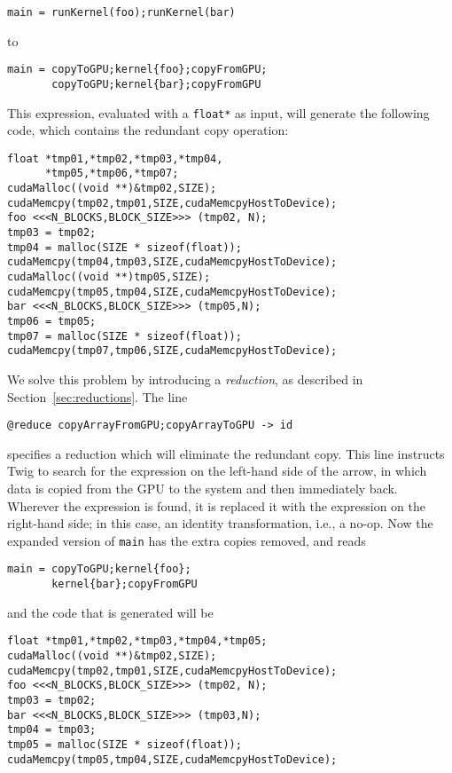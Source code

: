 \begin{verbatim}
main = runKernel(foo);runKernel(bar)
\end{verbatim}

to 

\begin{verbatim}
main = copyToGPU;kernel{foo};copyFromGPU;
       copyToGPU;kernel{bar};copyFromGPU
\end{verbatim}

This expression, evaluated with a \texttt{float*} as input, will generate the
following code, which contains the redundant copy operation:

\begin{verbatim}
float *tmp01,*tmp02,*tmp03,*tmp04,
      *tmp05,*tmp06,*tmp07;
cudaMalloc((void **)&tmp02,SIZE);
cudaMemcpy(tmp02,tmp01,SIZE,cudaMemcpyHostToDevice);
foo <<<N_BLOCKS,BLOCK_SIZE>>> (tmp02, N);
tmp03 = tmp02;
tmp04 = malloc(SIZE * sizeof(float));
cudaMemcpy(tmp04,tmp03,SIZE,cudaMemcpyHostToDevice);
cudaMalloc((void **)tmp05,SIZE);
cudaMemcpy(tmp05,tmp04,SIZE,cudaMemcpyHostToDevice);
bar <<<N_BLOCKS,BLOCK_SIZE>>> (tmp05,N);
tmp06 = tmp05;
tmp07 = malloc(SIZE * sizeof(float));
cudaMemcpy(tmp07,tmp06,SIZE,cudaMemcpyHostToDevice);
\end{verbatim}

We solve this problem by introducing a \emph{reduction}, as described in
Section~\ref{sec:reductions}. The line

\begin{verbatim}
@reduce copyArrayFromGPU;copyArrayToGPU -> id
\end{verbatim}

specifies a reduction which will eliminate the redundant copy. This line
instructs Twig to search for the expression on the left-hand side of the arrow,
in which data is copied from the GPU to the system and then immediately back.
Wherever the expression is found, it is replaced it with the expression on the
right-hand side; in this case, an identity transformation, i.e., a no-op. Now
the expanded version of \texttt{main} has the extra copies removed, and reads

\begin{verbatim}
main = copyToGPU;kernel{foo};
       kernel{bar};copyFromGPU
\end{verbatim}

and the code that is generated will be

\begin{verbatim}
float *tmp01,*tmp02,*tmp03,*tmp04,*tmp05;
cudaMalloc((void **)&tmp02,SIZE);
cudaMemcpy(tmp02,tmp01,SIZE,cudaMemcpyHostToDevice);
foo <<<N_BLOCKS,BLOCK_SIZE>>> (tmp02, N);
tmp03 = tmp02;
bar <<<N_BLOCKS,BLOCK_SIZE>>> (tmp03,N);
tmp04 = tmp03;
tmp05 = malloc(SIZE * sizeof(float));
cudaMemcpy(tmp05,tmp04,SIZE,cudaMemcpyHostToDevice);
\end{verbatim}

